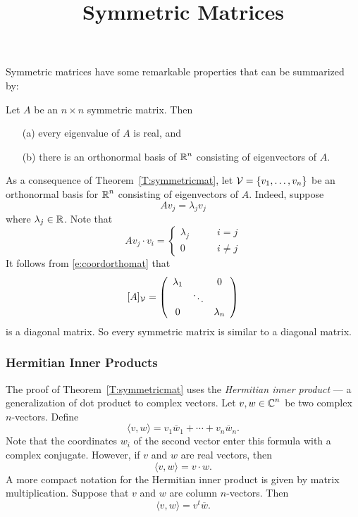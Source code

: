 \documentclass{ximera}
\title{Symmetric Matrices}
\begin{document}
\begin{abstract}
\end{abstract}
\maketitle


\label{S:symmetric}

Symmetric matrices have some remarkable properties that can be
summarized by:
\begin{theorem}  \label{T:symmetricmat}
Let $A$ be an $n\times n$ symmetric matrix.
Then
\begin{enumerate}
\item[(a)] every eigenvalue
of $A$ is real, and
\item[(b)] there is an orthonormal basis
of $\mbox{$\Bbb{R}$}^n$ consisting of
	eigenvectors of $A$.
\end{enumerate}
\end{theorem}

As a consequence of Theorem~\ref{T:symmetricmat}, let
${\cal V}=\{v_1,\ldots,v_n\}$ be an orthonormal basis for $\mbox{$\Bbb{R}$}^n$
consisting of eigenvectors of $A$.  Indeed, suppose
\[
Av_j = \lambda_jv_j
\]
where $\lambda_j\in\mbox{$\Bbb{R}$}$.  Note that
\[
Av_j\cdot v_i =  \left\{\begin{array}{rl} \lambda_j & \qquad i=j\\
			0 & \qquad i\neq j \end{array}\right.
\]
It follows from \eqref{e:coordorthomat} that
\[
[A]_{\cal V}= \left(\begin{array}{ccc} \lambda_1 & & 0 \\  & \ddots & \\
	0 &  & \lambda_n \end{array}\right)
\]
is a diagonal matrix.  So every symmetric matrix is similar to a diagonal
matrix.

\subsubsection*{Hermitian Inner Products}

The proof of Theorem~\ref{T:symmetricmat} uses the {\em Hermitian inner
product} --- a generalization of
dot product to complex vectors.
Let $v,w\in\mbox{$\Bbb{C}$}^n$ be two complex $n$-vectors.  Define
\[
\langle v,w \rangle = v_1\overline{w}_1 + \cdots + v_n\overline{w}_n.
\]
Note that the coordinates $w_i$ of the second vector enter this formula
with a complex conjugate.  However, if $v$ and $w$ are real vectors, then
\[
\langle v,w \rangle = v\cdot w.
\]
A more compact notation for the Hermitian inner product is given by
matrix multiplication.
Suppose that $v$ and $w$ are column $n$-vectors.
Then
\[
\langle v,w \rangle = v^t\overline{w}.
\]
\end{document}
